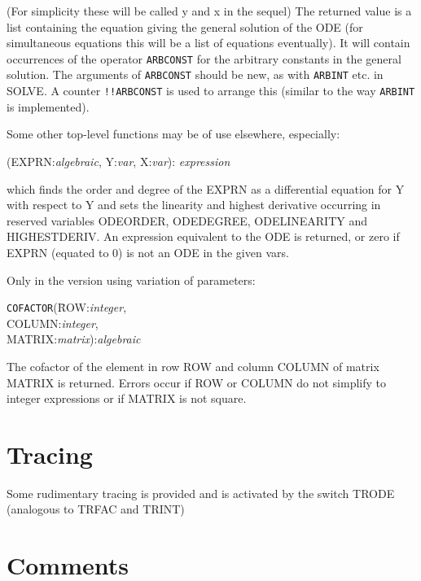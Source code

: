\noindent (For simplicity these will be called y and x in the sequel)
The returned value is a list containing the equation giving the
general solution of the ODE (for simultaneous equations this will be a
list of equations eventually). It will contain occurrences of the
operator {\tt ARBCONST} for the arbitrary constants in the general solution.
The arguments of {\tt ARBCONST} should be new, as with {\tt ARBINT} etc.
in SOLVE. A counter {\tt !!ARBCONST} is used to arrange this (similar to the
way {\tt ARBINT} is implemented).

Some other top-level functions may be of use elsewhere, especially:

\vspace{.1in}
(EXPRN:{\em algebraic}, Y:{\em var}, X:{\em var}):
{\em expression}
\vspace{.1in}

\noindent which finds the order and degree of the EXPRN as a differential
equation for Y with respect to Y and sets the linearity and highest
derivative occurring in reserved variables ODEORDER, ODEDEGREE,
ODELINEARITY and HIGHESTDERIV. An expression equivalent to the ODE is
returned, or zero if EXPRN (equated to 0) is not an ODE in the
given vars.

Only in the version using variation of parameters:

\vspace{.1in}
\begin{tabbing}
{\tt COFACTOR}(\=ROW:{\em integer}, \\
\>COLUMN:{\em integer}, \\
\>MATRIX:{\em matrix}):{\em algebraic}
\end{tabbing}
\vspace{.1in}

\noindent The cofactor of the element in row ROW and column COLUMN of matrix
MATRIX is returned. Errors occur if ROW or COLUMN do not simplify to integer 
expressions  or if MATRIX is not square.

\section{Tracing}


Some rudimentary tracing is provided and is activated by the switch TRODE
(analogous to TRFAC and TRINT)

\section{Comments}

